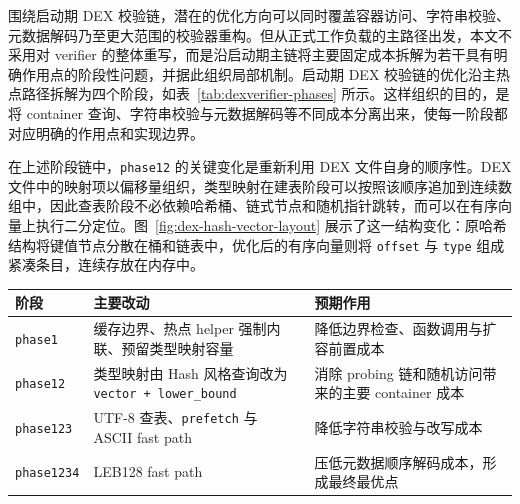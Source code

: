 围绕启动期 DEX 校验链，潜在的优化方向可以同时覆盖容器访问、字符串校验、元数据解码乃至更大范围的校验器重构。但从正式工作负载的主路径出发，本文不采用对 verifier 的整体重写，而是沿启动期主链将主要固定成本拆解为若干具有明确作用点的阶段性问题，并据此组织局部机制。启动期 DEX 校验链的优化沿主热点路径拆解为四个阶段，如表~\ref{tab:dexverifier-phases} 所示。这样组织的目的，是将 container 查询、字符串校验与元数据解码等不同成本分离出来，使每一阶段都对应明确的作用点和实现边界。

在上述阶段链中，\texttt{phase12} 的关键变化是重新利用 DEX 文件自身的顺序性。DEX 文件中的映射项以偏移量组织，类型映射在建表阶段可以按照该顺序追加到连续数组中，因此查表阶段不必依赖哈希桶、链式节点和随机指针跳转，而可以在有序向量上执行二分定位。图~\ref{fig:dex-hash-vector-layout} 展示了这一结构变化：原哈希结构将键值节点分散在桶和链表中，优化后的有序向量则将 \texttt{offset} 与 \texttt{type} 组成紧凑条目，连续存放在内存中。

\begingroup
    \centering
    \begin{minipage}{\textwidth}
        \centering
        \footnotesize
        \setlength{\tabcolsep}{3pt}
        \renewcommand{\arraystretch}{0.92}
        \label{tab:dexverifier-phases}
        \begin{tabular}{>{\raggedright\arraybackslash}p{2.0cm}>{\raggedright\arraybackslash}p{3.4cm}>{\raggedright\arraybackslash}p{7.0cm}}
            \hline
            \textbf{阶段} & \textbf{主要改动} & \textbf{预期作用} \\
            \hline
            \texttt{phase1} & 缓存边界、热点 helper 强制内联、预留类型映射容量 & 降低边界检查、函数调用与扩容前置成本 \\
            \texttt{phase12} & 类型映射由 Hash 风格查询改为 \texttt{vector + lower\_bound} & 消除 probing 链和随机访问带来的主要 container 成本 \\
            \texttt{phase123} & UTF-8 查表、\texttt{prefetch} 与 ASCII fast path & 降低字符串校验与改写成本 \\
            \texttt{phase1234} & LEB128 fast path & 压低元数据顺序解码成本，形成最终最优点 \\
            \hline
        \end{tabular}
    \end{minipage}
    \par
\endgroup

\vspace{0.5em}


